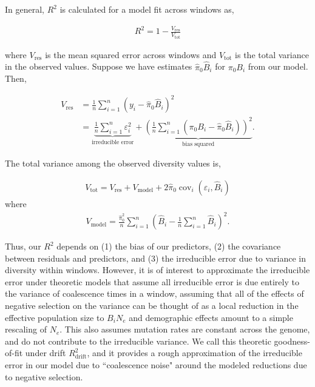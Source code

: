 \documentclass[11pt]{article}
\DeclareMathOperator{\cov}{cov}
\begin{document}
In general, $R^2$ is calculated for a model fit across windows as,

\begin{align}
    R^2 = 1 - \frac{V_\text{res}}{V_\text{tot}}
\end{align}

where $V_\text{res}$ is the mean squared error across windows and
$V_\text{tot}$ is the total variance in the observed values. Suppose we have
estimates $\widehat{\pi}_0 \widehat{B}_i$ for $\pi_0 B_i$ from our model. Then,

\begin{align}
    V_\text{res} &= \frac{1}{n} \sum_{i=1}^n (y_i - \widehat{\pi}_0 \widehat{B}_i)^2  \\
                 &= \underbrace{\frac{1}{n} \sum_{i=1}^n \varepsilon_i^2}_\text{irreducible error} + \underbrace{\left(\frac{1}{n} \sum_{i=1}^n (\pi_0 B_i - \widehat{\pi}_0 \widehat{B}_i)\right)^2}_\text{bias squared}.
\end{align}

The total variance among the observed diversity values is,

\begin{align}
    V_\text{tot} = V_\text{res} + V_\text{model} + 2\widehat{\pi}_0\cov_i(\varepsilon_i, \widehat{B}_i)
\end{align}
where 
\begin{align}
    V_\text{model} = \frac{\widehat{\pi}_0^2}{n} \sum_{i=1}^n \left(\widehat{B}_i - \frac{1}{n}\sum_{i=1}^n\widehat{B}_i\right)^2.
\end{align}

Thus, our $R^2$ depends on (1) the bias of our predictors, (2) the covariance
between residuals and predictors, and (3) the irreducible error due to variance
in diversity within windows. However, it is of interest to approximate the
irreducible error under theoretic models that assume all irreducible error is
due entirely to the variance of coalescence times in a window, assuming that
all of the effects of negative selection on the variance can be thought of as a
local reduction in the effective population size to $B_i N_e$ and demographic
effects amount to a simple rescaling of $N_e$. This also assumes mutation rates
are constant across the genome, and do not contribute to the irreducible
variance. We call this theoretic goodness-of-fit under drift
$R_\text{drift}^2$, and it provides a rough approximation of the irreducible
error in our model due to ``coalescence noise" around the modeled reductions
due to negative selection.
\end{document}
